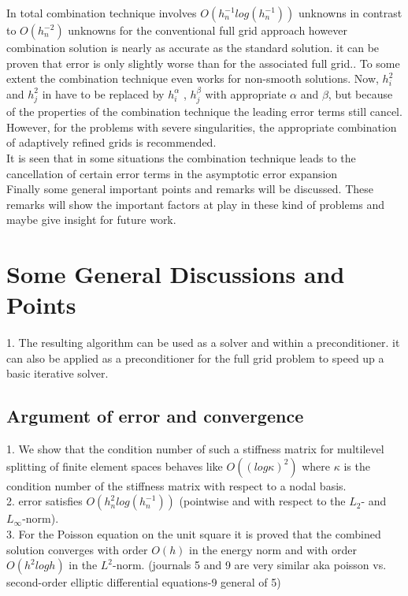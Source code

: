 In total combination technique involves $O({h}^{-1}_nlog({h}^{-1}_n))$  unknowns in contrast to $O({h}^{-2}_n) $ unknowns for the conventional full grid approach however combination solution is nearly as accurate as the standard solution. it can be proven that error is only slightly worse than for the associated full grid.\cite{Griebel1992a, Griebel1992b}. To some extent the combination technique even works for non-smooth solutions. Now, ${h}^2_i$ and ${h}^2_j$ in have to be replaced by ${h}^\alpha_i$ , ${h}^\beta_j$ with appropriate $\alpha$ and $\beta$, but because of the properties of the combination technique the leading error terms still cancel. However, for the problems with severe singularities, the appropriate combination of adaptively refined grids is recommended.\cite{Griebel1992a}\\ It is seen that in some situations the combination technique leads to the cancellation of certain error terms in the asymptotic error expansion\cite{Griebel1992b} \\

Finally some general important points and remarks will be discussed. These remarks will show the important factors at play in these kind of problems and maybe give insight for future work.

\section{Some General Discussions and Points}
1. The resulting algorithm can be used as a solver and within a preconditioner. it can also be applied as a preconditioner for the full grid problem to speed up a basic iterative solver. \cite{Griebel1992} \\

\subsection{Argument of error and convergence}
1. We show that the condition number of such a stiffness matrix for multilevel splitting of finite element spaces behaves like $O((log \kappa)^2) $ where $\kappa$ is the condition number of the stiffness matrix with respect to a nodal basis. \cite{Yserentant1986} \\
2. error satisfies $O({h}^2_nlog({h}^{-1}_n))$ (pointwise and with respect to the $L_2$- and $L_\infty$-norm).\cite{Griebel1992b} \\

3. For the Poisson equation on the unit square it is proved that the combined solution converges with order $O(h)$ in the energy norm and with order $O(h^2log h)$ in the $L^2$-norm. (journals 5 and 9 are very similar aka poisson vs. second-order elliptic differential equations-9 general of 5) \cite{Pflaum1993}\\

